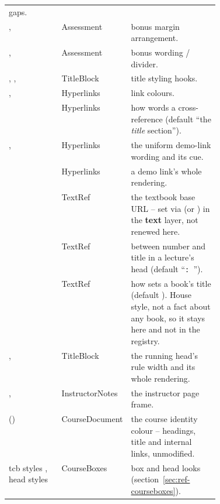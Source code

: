 {\begin{tabular}{@{}l l R{0.42\linewidth}@{}}
  gaps.\\[0.5ex]
,  & Assessment & bonus margin
  arrangement.\\
,  & Assessment & bonus wording
  / divider.\\[0.5ex]
, ,  & TitleBlock & title
  styling hooks.\\
,  & Hyperlinks & link colours.\\
 & Hyperlinks & how  words a
  cross-reference (default ``the \emph{title} section'').\\
,  & Hyperlinks & the uniform demo-link
  wording and its cue.\\
 & Hyperlinks & a demo link's whole rendering.\\
 & TextRef & the textbook base URL -- set via
   (or ) in the \textbf{text} layer,
  not renewed here.\\
 & TextRef & between number and title in a
  lecture's head (default ``\texttt{:\ }'').\\
 & TextRef & how  sets a book's title
  (default ). House style, not a fact about any book, so it
  stays here and not in the registry.\\
,  & TitleBlock & the running
  head's rule width and its whole rendering.\\[0.5ex]
,  & InstructorNotes &
  the instructor page frame.\\[0.5ex]
 () & CourseDocument & the course
  identity colour -- headings, title and internal links, unmodified.\\
tcb styles , head styles  & CourseBoxes & box and
  head looks (section~\ref{sec:ref-courseboxes}).\\
\end{tabular}}
